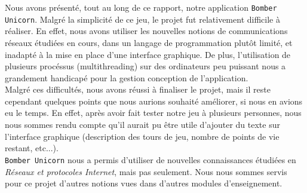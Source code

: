Nous avons présenté, tout au long de ce rapport, notre application \texttt{Bomber Unicorn}. Malgré la simplicité de ce jeu, le projet fut relativement difficile à réaliser. En effet, nous avons utiliser les nouvelles notions de communications réseaux étudiées en cours, dans un langage de programmation plutôt limité, et inadapté à la mise en place d'une interface graphique. De plus, l'utilisation de plusieurs procéssus (multithreading) sur des ordinateurs peu puissant nous a grandement handicapé pour la gestion conception de l'application.\\

 Malgré ces difficultés, nous avons réussi à finaliser le projet, mais il reste cependant quelques points que nous aurions souhaité améliorer, si nous en avions eu le temps. En effet, après avoir fait tester notre jeu à plusieurs personnes, nous nous sommes rendu compte qu'il aurait pu être utile d'ajouter du texte sur l'interface graphique (description des tours de jeu, nombre de points de vie restant, etc...).\\

\texttt{Bomber Unicorn} nous a permis d'utiliser de nouvelles connaissances étudiées en \textit{Réseaux et protocoles Internet}, mais pas seulement. Nous nous sommes servis pour ce projet d'autres notions vues dans d'autres modules d'enseignement.
